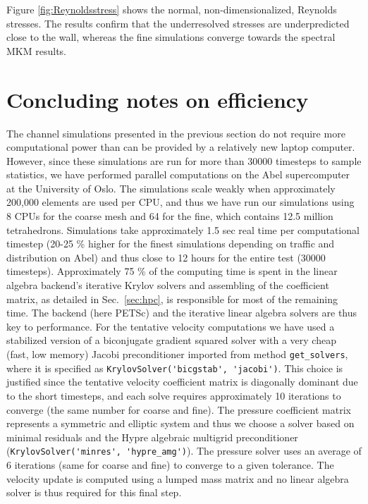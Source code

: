 \documentclass[final,3p,times,twocolumn]{elsarticle}
\newcommand{\inpyth}{\lstinline[style=inlinestyle]} %[]%
\begin{document}
Figure \ref{fig:Reynoldsstress} shows the normal, non-dimensionalized, Reynolds stresses. The results confirm that the underresolved stresses are underpredicted close to the wall, whereas the fine simulations converge towards the spectral MKM results.

\section{Concluding notes on efficiency} 
The channel simulations presented in the previous section do not require more computational power than can be provided by a relatively new laptop computer. However, since these simulations are run for more than 30000 timesteps to sample statistics, we have performed parallel computations on the Abel supercomputer at the University of Oslo. The simulations scale weakly when approximately 200,000 elements are used per CPU, and thus we have run our simulations using 8 CPUs for the coarse mesh and 64 for the fine, which contains 12.5 million tetrahedrons. Simulations take approximately 1.5 sec real time per computational timestep (20-25 \% higher for the finest simulations depending on traffic and distribution on Abel) and thus close to 12 hours for the entire test (30000 timesteps). Approximately 75 \% of the computing time is spent in the linear algebra backend's iterative Krylov solvers and assembling of the coefficient matrix, as detailed in Sec.~\ref{sec:hpc}, is responsible for most of the remaining time. The backend (here PETSc) and the iterative linear algebra solvers are thus key to performance. For the tentative velocity computations we have used a stabilized version of a biconjugate gradient squared solver \cite{bicgstab} with a very cheap (fast, low memory) Jacobi preconditioner imported from method \inpyth{get_solvers}, where it is specified as \inpyth{KrylovSolver('bicgstab', 'jacobi')}. This choice is justified since the tentative velocity coefficient matrix is diagonally dominant due to the short timesteps, and each solve requires approximately 10 iterations to converge (the same number for coarse and fine). The pressure coefficient matrix represents a symmetric and elliptic system and thus we choose a solver based on minimal residuals \cite{minres} and the Hypre algebraic multigrid preconditioner (\inpyth{KrylovSolver('minres', 'hypre_amg')}). The pressure solver uses an average of 6 iterations (same for coarse and fine) to converge to a given tolerance. The velocity update is computed using a lumped mass matrix and no linear algebra solver is thus required for this final step.
\end{document}
